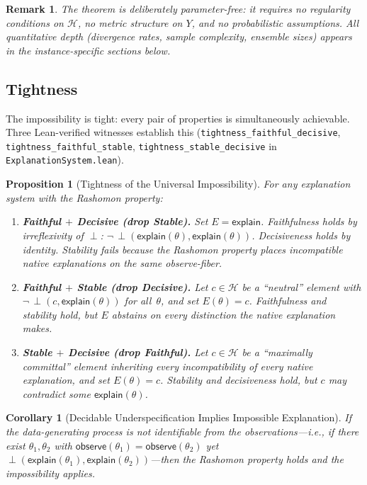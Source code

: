 \documentclass[11pt,a4paper]{article}
\newtheorem{corollary}[theorem]{Corollary}
\newtheorem{proposition}[theorem]{Proposition}
\newtheorem{remark}[theorem]{Remark}
\newcommand{\sH}{\mathcal{H}}
\newcommand{\incomp}{\perp}
\begin{document}
\begin{remark}
The theorem is deliberately parameter-free: it requires no regularity
conditions on $\sH$, no metric structure on $Y$, and no probabilistic
assumptions.  All quantitative depth (divergence rates, sample complexity,
ensemble sizes) appears in the instance-specific sections below.
\end{remark}

\subsection{Tightness}
\label{sec:tightness}

The impossibility is tight: every pair of properties is simultaneously
achievable.  Three Lean-verified witnesses establish this
(\texttt{tightness\_faithful\_decisive},
\texttt{tightness\_faithful\_stable},
\texttt{tightness\_stable\_decisive} in \texttt{ExplanationSystem.lean}).

\begin{proposition}[Tightness of the Universal Impossibility]
\label{prop:tightness}
For any explanation system with the Rashomon property:
\begin{enumerate}
  \item \textbf{Faithful $+$ Decisive (drop Stable).}
    Set $E = \mathsf{explain}$.  Faithfulness holds by irreflexivity of
    $\incomp$: $\neg\,\incomp(\mathsf{explain}(\theta), \mathsf{explain}(\theta))$.
    Decisiveness holds by identity.  Stability fails because the Rashomon
    property places incompatible native explanations on the same observe-fiber.

  \item \textbf{Faithful $+$ Stable (drop Decisive).}
    Let $c \in \sH$ be a ``neutral'' element with
    $\neg\,\incomp(c, \mathsf{explain}(\theta))$ for all~$\theta$, and set
    $E(\theta) = c$.  Faithfulness and stability hold, but $E$ abstains on
    every distinction the native explanation makes.

  \item \textbf{Stable $+$ Decisive (drop Faithful).}
    Let $c \in \sH$ be a ``maximally committal'' element inheriting every
    incompatibility of every native explanation, and set $E(\theta) = c$.
    Stability and decisiveness hold, but $c$ may contradict some
    $\mathsf{explain}(\theta)$.
\end{enumerate}
\end{proposition}

\begin{corollary}[Decidable Underspecification Implies Impossible Explanation]
\label{cor:decidable}
If the data-generating process is not identifiable from the
observations---i.e., if there exist $\theta_1, \theta_2$ with
$\mathsf{observe}(\theta_1) = \mathsf{observe}(\theta_2)$ yet
$\incomp(\mathsf{explain}(\theta_1), \mathsf{explain}(\theta_2))$---then
the Rashomon property holds and the impossibility applies.
\end{corollary}
\end{document}

